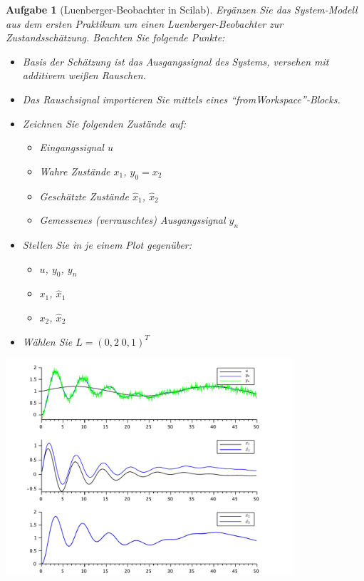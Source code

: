 \documentclass[11pt,a4paper,headsepline]{scrartcl}
\newtheorem{aufgabe}{Aufgabe}
\newtheorem{loesung}{L\"osung}
\begin{document}
\newpage
\normalsize
\begin{aufgabe}[Luenberger-Beobachter in Scilab]
\label{Task:Luenberger}
Erg\"anzen Sie das System-Modell aus dem ersten Praktikum um einen Luenberger-Beobachter zur Zustandssch\"atzung. Beachten Sie folgende Punkte:
\begin{itemize}
	\item Basis der Sch\"atzung ist das Ausgangssignal des Systems, versehen mit additivem wei{\ss}en Rauschen.
	\item Das Rauschsignal importieren Sie mittels eines ``fromWorkspace''-Blocks.
	\item Zeichnen Sie folgenden Zust\"ande auf:
	\begin{itemize}
		\item Eingangssignal $u$
		\item Wahre Zust\"ande $x_{1}$, $y_{0} = x_{2}$
		\item Gesch\"atzte Zust\"ande $\hat{x}_{1}$, $\hat{x}_{2}$
		\item Gemessenes (verrauschtes) Ausgangssignal $y_{n}$
	\end{itemize}
	\item Stellen Sie in je einem Plot gegen\"uber:
	\begin{itemize}
		\item $u$, $y_{0}$, $y_{n}$
		\item $x_{1}$, $\hat{x}_{1}$
		\item $x_{2}$, $\hat{x}_{2}$
		\end{itemize}
	\item W\"ahlen Sie $L = \left(0{,}2 \; 0{,}1\right)^T$
\end{itemize}
\begin{center}
\includegraphics[width = 0.8\textwidth]{P22Output}
\end{center}
\end{aufgabe}

\end{document}
